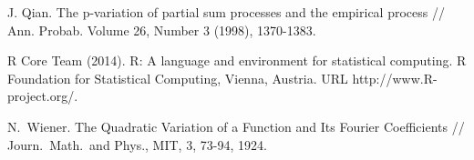 \documentclass[12pt, a4paper]{article}
\numberwithin{equation}{section}
\begin{document}
\begin{thebibliography}{99}
J. Qian. The p-variation of partial sum processes and the empirical process // Ann. Probab. Volume 26, Number 3 (1998), 1370-1383.  
  
R Core Team (2014). R: A language and environment for
statistical computing. R Foundation for Statistical
Computing, Vienna, Austria. URL http://www.R-project.org/.
  
N.\ Wiener. The Quadratic Variation of a Function and 
Its Fourier Coefficients // 
Journ.\ Math.\ and Phys., MIT, 3, 73-94, 1924.

  
  
  
  
  
\end{thebibliography}
\end{document}
